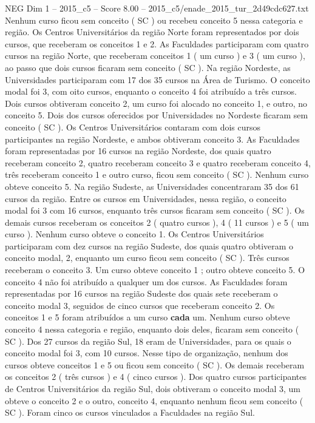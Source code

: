 \begin{textsample}{NEG Dim 1 – 2015\_c5 – Score 8.00 – 2015\_c5/enade\_2015\_tur\_2d49cdc627.txt}
Nenhum curso ficou sem conceito ( SC ) ou recebeu conceito 5 nessa categoria e região.
Os Centros Universitários da região Norte foram representados por dois cursos, que receberam os conceitos 1 e 2.
As Faculdades participaram com quatro cursos na região Norte, que receberam conceitos 1 ( um curso ) e 3 ( um curso ), ao passo que dois cursos ficaram sem conceito ( SC ).
Na região Nordeste, as Universidades participaram com 17 dos 35 cursos na Área de Turismo.
O conceito modal foi 3, com oito cursos, enquanto o conceito 4 foi atribuído a três cursos.
Dois cursos obtiveram conceito 2, um curso foi alocado no conceito 1, e outro, no conceito 5.
Dois dos cursos oferecidos por Universidades no Nordeste ficaram sem conceito ( SC ).
Os Centros Universitários contaram com dois cursos participantes na região Nordeste, e ambos obtiveram conceito 3.
As Faculdades foram representadas por 16 cursos na região Nordeste, dos quais quatro receberam conceito 2, quatro receberam conceito 3 e quatro receberam conceito 4, três receberam conceito 1 e outro curso, ficou sem conceito ( SC ).
Nenhum curso obteve conceito 5.
Na região Sudeste, as Universidades concentraram 35 dos 61 cursos da região.
Entre os cursos em Universidades, nessa região, o conceito modal foi 3 com 16 cursos, enquanto três cursos ficaram sem conceito ( SC ).
Os demais cursos receberam os conceitos 2 ( quatro cursos ), 4 ( 11 cursos ) e 5 ( um curso ).
Nenhum curso obteve o conceito 1.
Os Centros Universitários participaram com dez cursos na região Sudeste, dos quais quatro obtiveram o conceito modal, 2, enquanto um curso ficou sem conceito ( SC ).
Três cursos receberam o conceito 3.
Um curso obteve conceito 1 ; outro obteve conceito 5.
O conceito 4 não foi atribuído a qualquer um dos cursos.
As Faculdades foram representadas por 16 cursos na região Sudeste dos quais sete receberam o conceito modal 3, seguidos de cinco cursos que receberam conceito 2.
Os conceitos 1 e 5 foram atribuídos a um curso \textbf{cada} um.
Nenhum curso obteve conceito 4 nessa categoria e região, enquanto dois deles, ficaram sem conceito ( SC ).
Dos 27 cursos da região Sul, 18 eram de Universidades, para os quais o conceito modal foi 3, com 10 cursos.
Nesse tipo de organização, nenhum dos cursos obteve conceitos 1 e 5 ou ficou sem conceito ( SC ).
Os demais receberam os conceitos 2 ( três cursos ) e 4 ( cinco cursos ).
Dos quatro cursos participantes de Centros Universitários da região Sul, dois obtiveram o conceito modal 3, um obteve o conceito 2 e o outro, conceito 4, enquanto nenhum ficou sem conceito ( SC ).
Foram cinco os cursos vinculados a Faculdades na região Sul.

\end{textsample}
